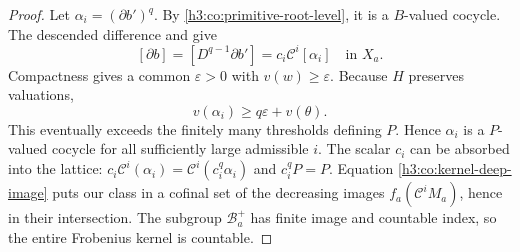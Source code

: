 \begin{proof}
Let $\alpha_i=(\partial b')^q$.  By
\eqref{h3:co:primitive-root-level}, it is a $B$-valued cocycle.
The descended difference and  give
\begin{equation}\label{h3:co:kernel-deep-image}
 [\partial b]=[D^{q-1}\partial b']
             =c_i\mathcal C^i[\alpha_i]\quad\text{in }X_a.
\end{equation}
Compactness gives a common $\varepsilon>0$ with $v(w)\geq\varepsilon$.
Because $H$ preserves valuations,
\[
 v(\alpha_i)\geq q\varepsilon+v(\theta).
\]
This eventually exceeds the finitely many thresholds defining $P$.
Hence $\alpha_i$ is a $P$-valued cocycle for all sufficiently large
admissible $i$.  The scalar $c_i$ can be absorbed into the lattice:
$c_i\mathcal C^i(\alpha_i)=\mathcal C^i(c_i^q\alpha_i)$ and
$c_i^qP=P$.  Equation \eqref{h3:co:kernel-deep-image} puts our class in a
cofinal set of the decreasing images $f_a(\mathcal C^iM_a)$, hence
in their intersection.  The subgroup $\mathcal B_a^+$ has finite image
and countable index, so the entire Frobenius kernel is countable.
\end{proof}

